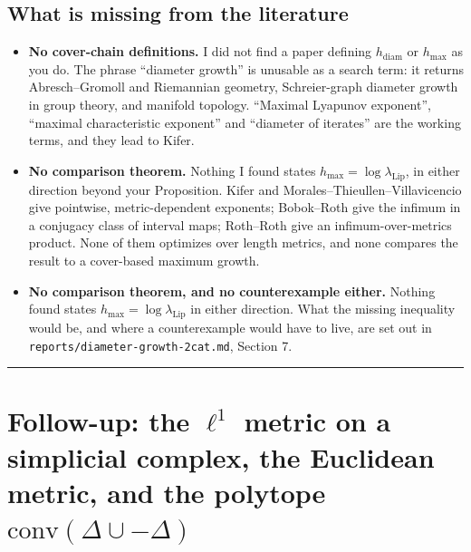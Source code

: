 \documentclass[
]{article}
\newcounter{none} %
\providecommand{\tightlist}{%
  \setlength{\itemsep}{0pt}\setlength{\parskip}{0pt}}
\begin{document}
\subsection{What is missing from the
literature}\label{what-is-missing-from-the-literature}

\begin{itemize}
\tightlist
\item
  \textbf{No cover-chain definitions.} I did not find a paper defining
  \(h_{\mathrm{diam}}\) or \(h_{\max}\) as you do. The phrase ``diameter
  growth'' is unusable as a search term: it returns Abresch--Gromoll and
  Riemannian geometry, Schreier-graph diameter growth in group theory,
  and manifold topology. ``Maximal Lyapunov exponent'', ``maximal
  characteristic exponent'' and ``diameter of iterates'' are the working
  terms, and they lead to Kifer.
\item
  \textbf{No comparison theorem.} Nothing I found states
  \(h_{\max}=\log\lambda_{\mathrm{Lip}}\), in either direction beyond
  your Proposition. Kifer and Morales--Thieullen--Villavicencio give
  pointwise, metric-dependent exponents; Bobok--Roth give the infimum in
  a conjugacy class of interval maps; Roth--Roth give an
  infimum-over-metrics product. None of them optimizes over length
  metrics, and none compares the result to a cover-based maximum growth.
\item
  \textbf{No comparison theorem, and no counterexample either.} Nothing
  found states \(h_{\max}=\log\lambda_{\mathrm{Lip}}\) in either
  direction. What the missing inequality would be, and where a
  counterexample would have to live, are set out in
  \texttt{reports/diameter-growth-2cat.md}, Section 7.
\end{itemize}

\begin{center}\rule{0.5\linewidth}{0.5pt}\end{center}

\section{\texorpdfstring{Follow-up: the \(\ell^1\) metric on a
simplicial complex, the Euclidean metric, and the polytope
\(\mathrm{conv}(\Delta\cup-\Delta)\)}{Follow-up: the \textbackslash ell\^{}1 metric on a simplicial complex, the Euclidean metric, and the polytope \textbackslash mathrm\{conv\}(\textbackslash Delta\textbackslash cup-\textbackslash Delta)}}\label{follow-up-the-ell1-metric-on-a-simplicial-complex-the-euclidean-metric-and-the-polytope-mathrmconvdeltacup-delta}
\end{document}
